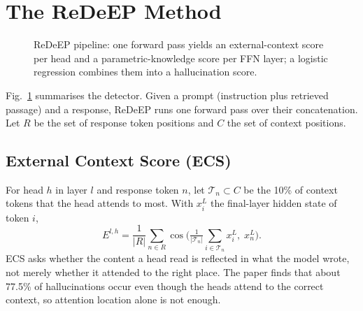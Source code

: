 \documentclass[conference]{IEEEtran}
\begin{document}
\section{The ReDeEP Method}
\begin{figure}[t]
\centering
{}
\caption{ReDeEP pipeline: one forward pass yields an external-context score per head and a parametric-knowledge score per FFN layer; a logistic regression combines them into a hallucination score.}
\label{fig:pipeline}
\end{figure}

Fig.~\ref{fig:pipeline} summarises the detector. Given a prompt (instruction plus retrieved passage) and a response, ReDeEP runs one forward pass over their concatenation. Let $R$ be the set of response token positions and $C$ the set of context positions.

\subsection{External Context Score (ECS)}
For head $h$ in layer $l$ and response token $n$, let $\mathcal{T}_n\subset C$ be the 10\% of context tokens that the head attends to most. With $x^{L}_i$ the final-layer hidden state of token $i$,
\begin{equation}
E^{l,h} = \frac{1}{|R|}\sum_{n\in R}\cos\!\Big(\tfrac{1}{|\mathcal{T}_n|}\textstyle\sum_{i\in\mathcal{T}_n} x^{L}_{i},\; x^{L}_{n}\Big).
\end{equation}
ECS asks whether the content a head read is reflected in what the model wrote, not merely whether it attended to the right place. The paper finds that about 77.5\% of hallucinations occur even though the heads attend to the correct context, so attention location alone is not enough.
\end{document}
